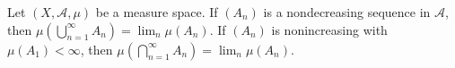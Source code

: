 Let $(X, \mathcal{A}, \mu)$ be a measure space. If $(A_n)$ is a nondecreasing sequence in $\mathcal{A}$, then $\mu(\bigcup_{n=1}^{\infty} A_n) = \lim_{n} \mu(A_n)$. If $(A_n)$ is nonincreasing with $\mu(A_1) < \infty$, then $\mu(\bigcap_{n=1}^{\infty} A_n) = \lim_{n} \mu(A_n)$.
